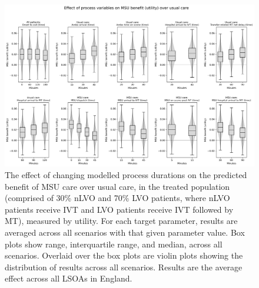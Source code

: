 \begin{figure}[h!]
    \centering
    \includegraphics[width=1\linewidth]{images/msu_net_utility_benefit.png}
    \caption{The effect of changing modelled process durations on the predicted benefit of MSU care over usual care, in the treated population (comprised of 30\% nLVO and 70\% LVO patients, where nLVO patients receive IVT and LVO patients receive IVT followed by MT), measured by utility. For each target parameter, results are averaged across all scenarios with that given parameter value. Box plots show range, interquartile range, and median, across all scenarios. Overlaid over the box plots are violin plots showing the distribution of results across all scenarios. Results are the average effect across all LSOAs in England.}
    \label{fig:scenarios_utility}
\end{figure}


